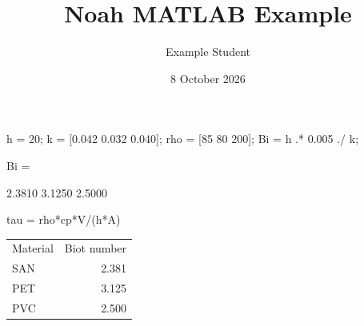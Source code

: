 \documentclass{article}
\title{Noah MATLAB Example}
\author{Example Student}
\date{8 October 2026}
\begin{document}
\maketitle
{}


\begin{matlabcode}
h = 20;                  %
k = [0.042 0.032 0.040];
rho = [85 80 200];       %
Bi = h .* 0.005 ./ k;
\end{matlabcode}

\begin{matlaboutput}
Bi =

    2.3810    3.1250    2.5000
\end{matlaboutput}

\begin{matlabsymbolicoutput}
tau = rho*cp*V/(h*A)
\end{matlabsymbolicoutput}

\begin{matlabtableoutput}{%
  \begin{tabular}{lr}
    Material & Biot number \\
    SAN & 2.381 \\
    PET & 3.125 \\
    PVC & 2.500
  \end{tabular}%
}
\end{matlabtableoutput}
\end{document}
